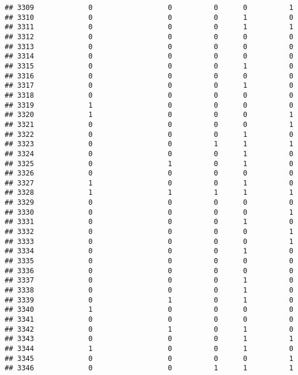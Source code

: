 \documentclass[
]{article}
\begin{document}
\begin{verbatim}
## 3309             0                  0          0      0          1
## 3310             0                  0          0      1          0
## 3311             0                  0          0      1          1
## 3312             0                  0          0      0          0
## 3313             0                  0          0      0          0
## 3314             0                  0          0      0          0
## 3315             0                  0          0      1          0
## 3316             0                  0          0      0          0
## 3317             0                  0          0      1          0
## 3318             0                  0          0      0          0
## 3319             1                  0          0      0          0
## 3320             1                  0          0      0          1
## 3321             0                  0          0      0          1
## 3322             0                  0          0      1          0
## 3323             0                  0          1      1          1
## 3324             0                  0          0      1          0
## 3325             0                  1          0      1          0
## 3326             0                  0          0      0          0
## 3327             1                  0          0      1          0
## 3328             1                  1          1      1          1
## 3329             0                  0          0      0          0
## 3330             0                  0          0      0          1
## 3331             0                  0          0      1          0
## 3332             0                  0          0      0          1
## 3333             0                  0          0      0          1
## 3334             0                  0          0      1          0
## 3335             0                  0          0      0          0
## 3336             0                  0          0      0          0
## 3337             0                  0          0      1          0
## 3338             0                  0          0      1          0
## 3339             0                  1          0      1          0
## 3340             1                  0          0      0          0
## 3341             0                  0          0      0          0
## 3342             0                  1          0      1          0
## 3343             0                  0          0      1          1
## 3344             1                  0          0      1          0
## 3345             0                  0          0      0          1
## 3346             0                  0          1      1          1

\end{verbatim}
\end{document}
